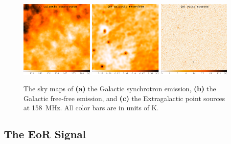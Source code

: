 \documentclass[modern]{aastex62}
\begin{document}
\begin{figure}
  \centering
  \includegraphics[width=0.32\textwidth]{gsyn-f158-heat}
  \includegraphics[width=0.32\textwidth]{gff-f158-heat}
  \includegraphics[width=0.32\textwidth]{pointsources-f158-heat-log}
  \caption{\label{fig:map-fg-other}%
    The sky maps of
    \textbf{(a)} the Galactic synchrotron emission,
    \textbf{(b)} the Galactic free-free emission, and
    \textbf{(c)} the Extragalactic point sources
    at \SI{158}{\MHz}.
    All color bars are in units of \si{\kelvin}.
  }
\end{figure}


\subsection{The EoR Signal}
\label{sec:eor-signal}
\end{document}
